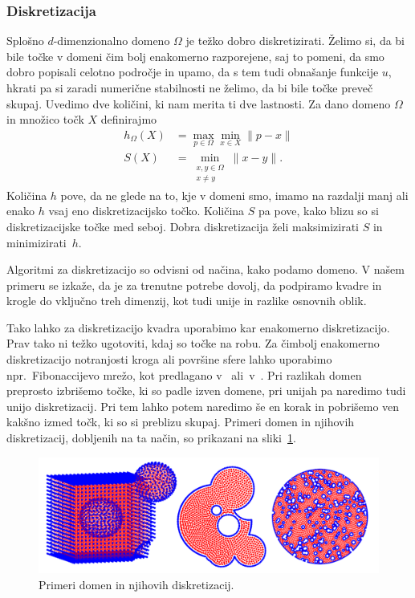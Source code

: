 \documentclass[a4paper,twoside]{article}
\theoremstyle{definition} %
\theoremstyle{plain} %
\numberwithin{equation}{section}
\begin{document}
\subsubsection{Diskretizacija}
Splošno $d$-dimenzionalno domeno $\Omega$ je težko dobro diskretizirati.
Želimo si, da bi bile točke v domeni čim bolj enakomerno razporejene, saj to
pomeni, da smo dobro popisali celotno področje in upamo, da s tem tudi obnašanje
funkcije $u$, hkrati pa si zaradi numerične stabilnosti ne želimo, da bi bile
točke preveč skupaj. Uvedimo dve količini, ki nam merita ti dve lastnosti.
Za dano domeno $\Omega$ in množico točk $X$ definirajmo
\begin{align}
  h_\Omega(X) &= \max_{p \in \Omega} \min_{x \in X} \|p - x\| \\
  \label{eq:def-hs}
  S(X) &= \min_{\substack{x, y \in \Omega \\ x \neq y}} \|x-y\|. \nonumber
\end{align}
Količina $h$ pove, da ne glede na to, kje v domeni smo, imamo na razdalji manj ali enako $h$
vsaj eno diskretizacijsko točko. Količina $S$ pa pove, kako blizu so si
diskretizacijske točke med seboj. Dobra diskretizacija želi maksimizirati $S$ in
minimizirati~$h$.

Algoritmi za diskretizacijo so odvisni od načina, kako podamo domeno.
V našem primeru se izkaže, da je za trenutne potrebe dovolj, da podpiramo
kvadre in krogle do vključno treh dimenzij, kot tudi unije in razlike
osnovnih oblik.

Tako lahko za diskretizacijo kvadra uporabimo kar enakomerno diskretizacijo.
Prav tako ni težko ugotoviti, kdaj so točke na robu. Za čimbolj enakomerno
diskretizacijo notranjosti kroga ali površine sfere
lahko uporabimo npr.~Fibonaccijevo mrežo, kot predlagano
v~\cite{hannay2004fibonacci} ali~v~\cite{gonzalez2010measurement}.
Pri razlikah domen preprosto izbrišemo točke, ki so padle izven domene,
pri unijah pa naredimo tudi unijo diskretizacij. Pri tem lahko potem naredimo še
en korak in pobrišemo ven kakšno izmed točk, ki so si preblizu skupaj.
Primeri domen in njihovih diskretizacij, dobljenih na ta način, so prikazani na sliki~\ref{fig:domains}.
\begin{figure}[!ht]
  \centering
  \includegraphics[width=\textwidth]{images/domains_generated.png}
  \caption{Primeri domen in njihovih diskretizacij.}
  \label{fig:domains}
\end{figure}
\end{document}
